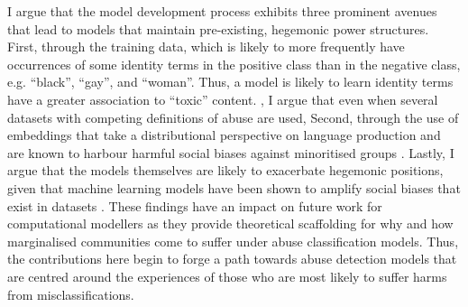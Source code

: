  I argue that the model development process exhibits three prominent avenues that lead to models that maintain pre-existing, hegemonic power structures.
First, through the training data, which is likely to more frequently have occurrences of some identity terms in the positive class than in the negative class, e.g. ``black'', ``gay'', and ``woman''.
Thus, a model is likely to learn identity terms have a greater association to ``toxic'' content.
, I argue that even when several datasets with competing definitions of abuse are used, 
Second,  through the use of  embeddings that take a distributional perspective on language production and are known to harbour harmful social biases against minoritised groups \citep{Speer:2017}.
Lastly, I argue that the models themselves are likely to exacerbate hegemonic positions, given that machine learning models have been shown to amplify social biases that exist in datasets \citep{Zhao:2017}.
These findings have an impact on future work for computational modellers as they provide theoretical scaffolding for why and how marginalised communities come to suffer under abuse classification models.
Thus, the contributions here begin to forge a path towards abuse detection models that are centred around the experiences of those who are most likely to suffer harms from misclassifications.

